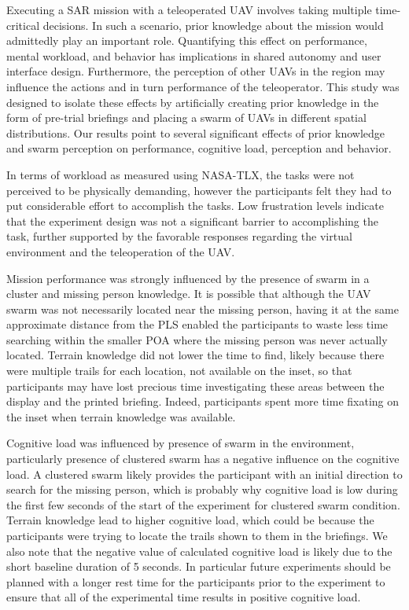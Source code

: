 \documentclass{article}
\begin{document}
Executing a SAR mission with a teleoperated UAV involves taking multiple time-critical decisions. In such a scenario, prior knowledge about the mission would admittedly play an important role. Quantifying this effect on performance, mental workload, and behavior has implications in shared autonomy and user interface design. Furthermore, the perception of other UAVs in the region may influence the actions and in turn performance of the teleoperator. This study was designed to isolate these effects by artificially creating prior knowledge in the form of pre-trial briefings and placing a swarm of UAVs in different spatial distributions. Our results point to several significant effects of prior knowledge and swarm perception on performance, cognitive load, perception and behavior.
	
In terms of workload as measured using NASA-TLX, the tasks were not perceived to be physically demanding, however the participants felt they had to put considerable effort to accomplish the tasks. Low frustration levels indicate that the experiment design was not a significant barrier to accomplishing the task, further supported by the favorable responses regarding the virtual environment and the teleoperation of the UAV.


Mission performance was strongly influenced by the presence of swarm in a cluster and missing person knowledge. It is possible that although the UAV swarm was not necessarily located near the missing person, having it at the same approximate distance from the PLS enabled the participants to waste less time searching within the smaller POA where the missing person was never actually located. Terrain knowledge did not lower the time to find, likely because there were multiple trails for each location, not available on the inset, so that participants may have lost precious time investigating these areas between the display and the printed briefing. Indeed, participants spent more time fixating on the inset when terrain knowledge was available.

Cognitive load was influenced by presence of swarm in the environment, particularly presence of clustered swarm has a negative influence on the cognitive load. A clustered swarm likely provides the participant with an initial direction to search for the missing person, which is probably why cognitive load is low during the first few seconds of the start of the experiment for clustered swarm condition. Terrain knowledge lead to higher cognitive load, which could be because the participants were trying to locate the trails shown to them in the briefings. We also note that the negative value of calculated cognitive load is likely due to the short baseline duration of 5 seconds. In particular future experiments should be planned with a longer rest time for the participants prior to the experiment to ensure that all of the experimental time results in positive cognitive load.   
\end{document}
